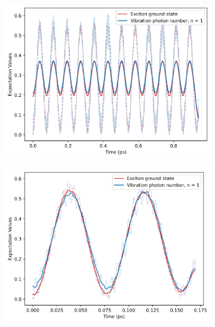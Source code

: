 \documentclass[11pt]{article}
\begin{document}
\begin{figure}[H]
    \centering
    \begin{subfigure}{0.49\textwidth}
        \centering
        \includegraphics[width=\linewidth]{Research Project/Code/results/ExVib/Closed/Envelope/pops_ground.png}
        \caption{}
        \label{fig:EVM_CQS_Pop_env}
    \end{subfigure}
    \hfill
    \begin{subfigure}{0.49\textwidth}
        \centering
        \includegraphics[width=\linewidth]{Research Project/Code/results/ExVib/Closed/Fast/pops_ground.png}
        \caption{}
        \label{fig:EVM_CQS_Pop_fast}
    \end{subfigure}
    
    \caption{}
    \label{fig:EVM_CQS_Pops}
\end{figure}
\end{document}
